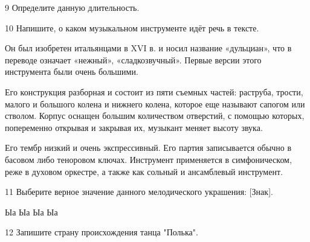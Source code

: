 \documentclass{../../libre-oge}
\begin{document}
\begin{task}{9}
	Определите данную длительность.
	
	
	\answerfield
\end{task}

\begin{task}{10}
	Напишите, о каком музыкальном инструменте идёт речь в тексте.
	
	\bigskip
	
	\setlength{\parindent}{25pt}
	
	Он был изобретен итальянцами в XVI в. и носил название «дульциан», что в переводе означает «нежный», «сладкозвучный». Первые версии этого инструмента были очень большими. 
	
	Его конструкция разборная и состоит из пяти съемных частей: раструба, трости, малого и большого колена и нижнего колена, которое еще называют сапогом или стволом. Корпус оснащен большим количеством отверстий, с помощью которых, попеременно открывая и закрывая их, музыкант меняет высоту звука. 
	
	Его тембр низкий и очень экспрессивный. Его партия записывается обычно в басовом либо теноровом ключах. Инструмент применяется в симфоническом, реже в духовом оркестре, а также как сольный и ансамблевый инструмент.
	
	\setlength{\parindent}{0pt}
	
	\bigskip
	
	\answerfield
\end{task}

\begin{task}{11}
	Выберите верное значение данного мелодического украшения: [Знак].
	
	
	\begin{numberchoices}
		\choice Ыа
		\choice Ыа
		\choice Ыа
		\choice Ыа
	\end{numberchoices}
	
	\answerbox
\end{task}

\begin{task}{12}
	Запишите страну происхождения танца "Полька".
	
	\answerfield
\end{task}
\end{document}
